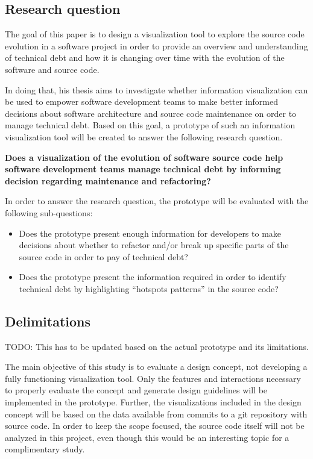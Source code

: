 \subsection{Research question}
The goal of this paper is to design a visualization tool to explore the source code evolution in a software project in order to provide an overview and understanding of technical debt and how it is changing over time with the evolution of the software and source code. 

In doing that, his thesis aims to investigate whether information visualization can be used to empower software development teams to make better informed decisions about software architecture and source code maintenance on order to manage technical debt. Based on this goal, a prototype of such an information visualization tool will be created to answer the following research question.


\smallskip
\textbf{
Does a visualization of the evolution of software source code help software development teams manage technical debt by informing decision regarding maintenance and refactoring?
}
\smallskip

In order to answer the research question, the prototype will be evaluated with the following sub-questions:
\begin{itemize}
\item Does the prototype present enough information for developers to make decisions about whether to refactor and/or break up specific parts of the source code in order to pay of technical debt?
\item Does the prototype present the information required in order to identify technical debt by highlighting “hotspots patterns” \cite{mo_hotspot_2015} in the source code?
\end{itemize}

\subsection{Delimitations}

TODO: This has to be updated based on the actual prototype and its limitations.

The main objective of this study is to evaluate a design concept, not developing a fully functioning visualization tool. Only the features and interactions necessary to properly evaluate the concept and generate design guidelines will be implemented in the prototype. Further, the visualizations included in the design concept will be based on the data available from commits to a git repository with source code. In order to keep the scope focused, the source code itself will not be analyzed in this project, even though this would be an interesting topic for a complimentary study.